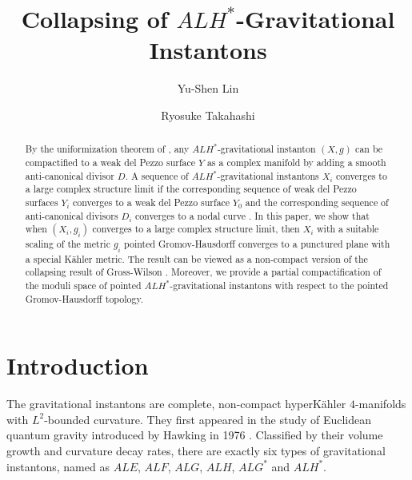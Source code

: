 \documentclass[11pt]{amsart}
\title[Collapsing of $ALH^*$-Gravitational Instantons]{Collapsing of $ALH^*$-Gravitational Instantons}
\author[Y.-S. Lin] {Yu-Shen Lin}
\author[R. Takahashi]{Ryosuke Takahashi}
\theoremstyle{plain}
\theoremstyle{definition}
\numberwithin{equation}{section}
\begin{document}
   



\begin{abstract}
   By the uniformization theorem of \cite{HSVZ}, any $ALH^*$-gravitational instanton $(X,g)$ can be compactified to a weak del Pezzo surface $Y$ as a complex manifold by adding a smooth anti-canonical divisor $D$. A sequence of $ALH^*$-gravitational instantons $X_i$ converges to a large complex structure limit if the corresponding sequence of weak del Pezzo surfaces $Y_i$ converges to a weak del Pezzo surface $Y_0$ and the corresponding sequence of anti-canonical divisors $D_i$ converges to a nodal curve   
    \cite{CJL2}.
   In this paper, we show that when $(X_i,g_i)$ converges to a large complex structure limit, then $X_i$ with a suitable scaling of the metric $g_i$ pointed Gromov-Hausdorff converges to
    a punctured plane with a special K\"ahler metric. The result can be viewed as a non-compact version of the collapsing result of Gross-Wilson \cite{GW}. Moreover, we provide a partial compactification of the moduli space of pointed $ALH^*$-gravitational instantons with respect to the pointed Gromov-Hausdorff topology. 
	 \end{abstract}
\maketitle
\section{Introduction}
The gravitational instantons are  complete, non-compact hyperK\"ahler $4$-manifolds with $L^2$-bounded curvature. They first appeared in the study of Euclidean quantum gravity introduced by Hawking in 1976 \cite{Haw}. Classified by their volume growth and curvature decay rates, there are exactly six types of gravitational instantons, named as $ALE$, $ALF$, $ALG$, $ALH$, $ALG^*$ and $ALH^*$\cite{SZ}.
\end{document}
